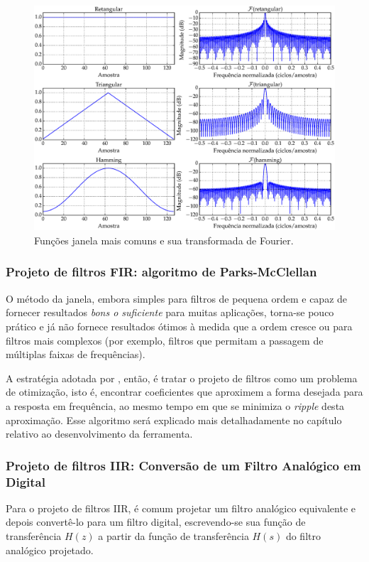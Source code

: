 \begin{figure}[H]
  \centering
  \includegraphics[scale=0.5]{images/plots/window_functions}
  \caption{Funções janela mais comuns e sua transformada de Fourier.}
  \label{fig:window_functions}
\end{figure}


\subsubsection{Projeto de filtros FIR: algoritmo de Parks-McClellan}
O método da janela, embora simples para filtros de pequena ordem e capaz de fornecer resultados \textit{bons o suficiente} para muitas aplicações, torna-se pouco prático e já não fornece resultados ótimos à medida que a ordem cresce ou para filtros mais complexos (por exemplo, filtros que permitam a passagem de múltiplas faixas de frequências). 

A estratégia adotada por \cite{mcclellan}, então, é tratar o projeto de filtros como um problema de otimização, isto é, encontrar coeficientes que aproximem a forma desejada para a resposta em frequência, ao mesmo tempo em que se minimiza o \textit{ripple} desta aproximação. Esse algoritmo será explicado mais detalhadamente no capítulo relativo ao desenvolvimento da ferramenta.

\subsubsection{Projeto de filtros IIR: Conversão de um Filtro Analógico em Digital}
Para o projeto de filtros IIR, é comum projetar um filtro analógico equivalente e depois convertê-lo para um filtro digital, escrevendo-se sua função de transferência $H(z)$ a partir da função de transferência $H(s)$ do filtro analógico projetado.

